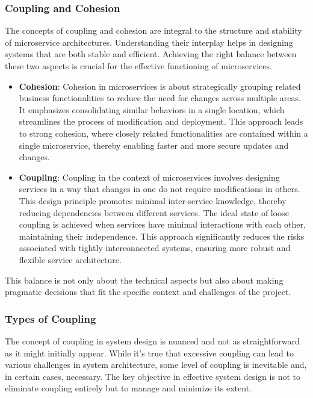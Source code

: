 \subsubsection{Coupling and Cohesion}
The concepts of coupling and cohesion are integral to the structure and stability of microservice
architectures. Understanding their interplay helps in designing systems that are both stable and
efficient.
Achieving the right balance between these two aspects is crucial for the
effective functioning of microservices.

\begin{itemize}
    \item \textbf{Cohesion}: Cohesion in microservices is about strategically grouping related
          business functionalities to reduce the need for changes across multiple areas. It emphasizes
          consolidating similar behaviors in a single location, which streamlines the process of
          modification and deployment. This approach leads to strong cohesion, where closely related
          functionalities are contained within a single microservice, thereby enabling faster and more
          secure updates and changes.
    \item \textbf{Coupling}: Coupling in the context of microservices involves designing services in
          a way that changes in one do not require modifications in others. This design principle promotes
          minimal inter-service knowledge, thereby reducing dependencies between different services. The
          ideal state of loose coupling is achieved when services have minimal interactions with each
          other, maintaining their independence. This approach significantly reduces the risks associated
          with tightly interconnected systems, ensuring more robust and flexible service architecture.
\end{itemize}

This balance is not only about the technical aspects but also about making pragmatic decisions that
fit the specific context and challenges of the project.

\subsubsection{Types of Coupling}
The concept of coupling in system design is nuanced and not as straightforward as it might initially
appear. While it's true that excessive coupling can lead to various challenges in system
architecture, some level of coupling is inevitable and, in certain cases, necessary. The key
objective in effective system design is not to eliminate coupling entirely but to manage and
minimize its extent.

